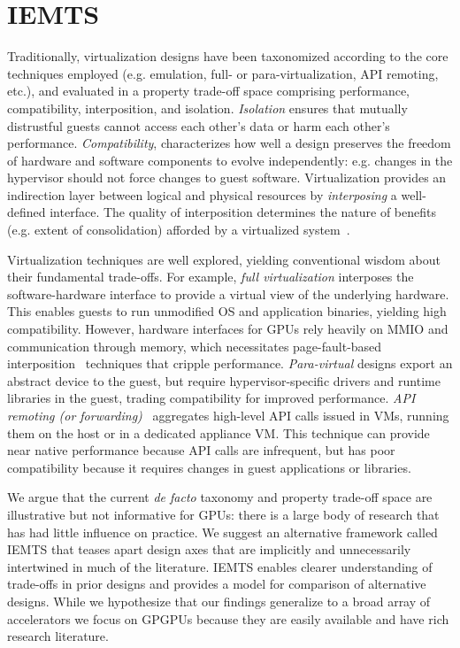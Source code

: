 \section{IEMTS}
\label{sec:iemts}

Traditionally, virtualization designs have been taxonomized
according to the core techniques employed (e.g. emulation, full- or para-virtualization,
API remoting, etc.), and evaluated
in a property trade-off space comprising performance,
compatibility, interposition, and isolation. \emph{Isolation} ensures that mutually distrustful
guests cannot access each other's data or harm each other's performance. \emph{Compatibility},
characterizes how well a design preserves the freedom of
hardware and software components to evolve independently: e.g. changes in the hypervisor
should not force changes to guest software.
Virtualization provides an indirection layer between
logical and physical resources by \emph{interposing} a well-defined
interface. The quality of
interposition determines the nature of benefits (e.g. extent of consolidation) afforded by a
virtualized system~\cite{waldspurger12cacm}.

Virtualization techniques are well explored, yielding conventional
wisdom about their fundamental trade-offs. For example,
\emph{full virtualization} interposes the software-hardware interface
to provide a virtual view of the
underlying hardware. This enables guests to run unmodified OS and
application binaries, yielding high compatibility. However, hardware interfaces
for GPUs rely heavily on MMIO and communication through memory, which
necessitates page-fault-based interposition~\cite{tian2014full,
intel_kvmgt,kindratenko2009gpu,montella2012general} techniques that cripple
performance.
\emph{Para-virtual} designs export an abstract device to the guest,
but require hypervisor-specific drivers and runtime libraries in the
guest, trading compatibility for improved performance.
\emph{API remoting (or forwarding)}~\cite{gupta2009gvim, dowty2009gpu,
giunta2010gpgpu, shi2012vcuda} aggregates high-level API calls
issued in VMs, running them on the host or in a dedicated appliance VM.
This technique can provide near native performance because API calls
are infrequent, but has poor compatibility because it requires
changes in guest applications or libraries.

We argue that the current \emph{de facto} taxonomy and property trade-off space
are illustrative but not informative for GPUs:
there is a large body of research that has had little influence on practice.
We suggest an alternative framework called \textsc{IEMTS} that teases apart design
axes that are implicitly and unnecessarily intertwined in much of the literature.
\textsc{IEMTS} enables clearer understanding of trade-offs in prior designs
and provides a model for comparison of alternative designs.
While we hypothesize that our findings generalize to a broad array of accelerators
we focus on GPGPUs because they are easily available and have rich research literature.

